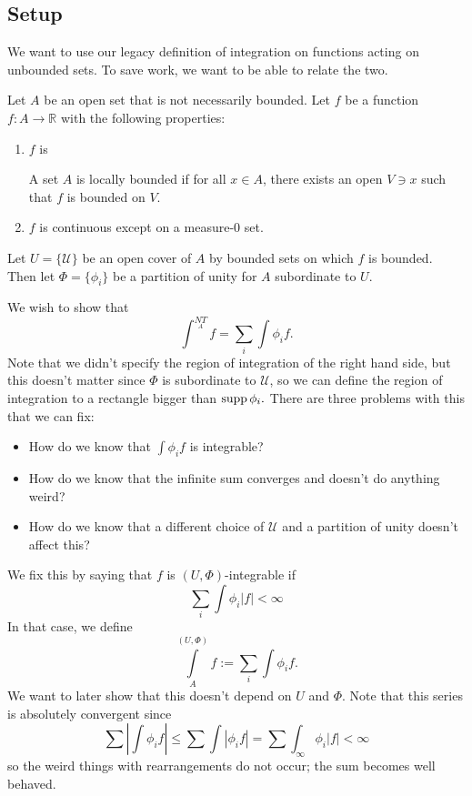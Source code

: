 \documentclass{article}
\numberwithin{equation}{section}
\begin{document}
\subsection{Setup}
We want to use our legacy definition of integration on functions acting on unbounded sets. To save work, we want to be able to relate the two.

Let $A$ be an open set that is not necessarily bounded. Let $f$ be a function $f:A\rightarrow \mathbb{R}$ with the following properties:
\begin{enumerate}
    \item $f$ is 
    \begin{definition}
        A set $A$ is locally bounded if for all $x\in A$, there exists an open $V \ni x$ such that $f$ is bounded on $V$.
    \end{definition}
    \item $f$ is continuous except on a measure-$0$ set.
\end{enumerate}
Let $U=\{\mathcal{U}\}$ be an open cover of $A$ by bounded sets on which $f$ is bounded. Then let $\Phi = \{\phi_i\}$ be a partition of unity for $A$ subordinate to $U$.

We wish to show that 
\begin{equation}
    \int^{NT}\limits_{A} f = \sum_i \int \phi_i f.
\end{equation}
Note that we didn't specify the region of integration of the right hand side, but this doesn't matter since $\Phi$ is subordinate to $\mathcal{U}$, so we can define the region of integration to a rectangle bigger than $\operatorname{supp} \phi_i.$ There are three problems with this that we can fix:
\begin{itemize}
    \item How do we know that $\int \phi_i f$ is integrable?
    \item How do we know that the infinite sum converges and doesn't do anything weird?
    \item How do we know that a different choice of $\mathcal{U}$ and a partition of unity doesn't affect this?
\end{itemize}
We fix this by saying that $f$ is $(U,\Phi)$-integrable if 
\begin{equation}
    \sum_i \int\phi_i |f| < \infty
\end{equation}
In that case, we define 
\begin{equation}
    \int\limits_A^{(U,\Phi)} f := \sum_{i} \int \phi_i f.
\end{equation}
We want to later show that this doesn't depend on $U$ and $\Phi.$ Note that this series is absolutely convergent since
\begin{equation}
    \sum \left|\int \phi_i f\right| \le \sum \int|\phi_i f| = \sum\int_{\infty}\phi_i |f| < \infty
\end{equation}
so the weird things with rearrangements do not occur; the sum becomes well behaved.
\end{document}
